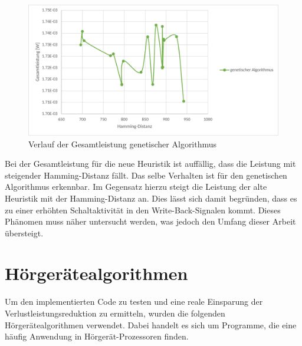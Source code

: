 \begin{figure}[H]
	\centering
	\includegraphics[width=\textwidth]{fig/totalpower_genetic.pdf}
	\caption{Verlauf der Gesamtleistung genetischer Algorithmus}
	\label{fig:totalpower_genetic}
\end{figure}

Bei der Gesamtleistung für die neue Heuristik ist auffällig, dass die Leistung mit steigender Hamming-Distanz fällt. Das selbe Verhalten ist für den genetischen Algorithmus erkennbar. Im Gegensatz hierzu steigt die Leistung der alte Heuristik mit der Hamming-Distanz an. Dies lässt sich damit begründen, dass es zu einer erhöhten Schaltaktivität in den Write-Back-Signalen kommt. Dieses Phänomen muss näher untersucht werden, was jedoch den Umfang dieser Arbeit übersteigt.

\section{Hörgerätealgorithmen}
\label{sec:testprogamme}
Um den implementierten Code zu testen und eine reale Einsparung der Verlustleistungsreduktion zu ermitteln, wurden die folgenden Hörgerätealgorithmen verwendet. Dabei handelt es sich um Programme, die eine häufig Anwendung in Hörgerät-Prozessoren finden.

